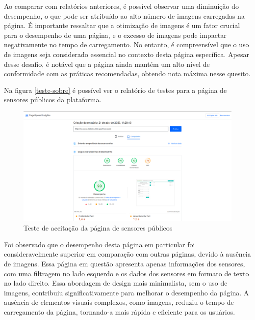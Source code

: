 \documentclass[tcc,capa]{texufpel}
\begin{document}
Ao comparar com relatórios anteriores, é possível observar uma diminuição do desempenho, o que pode ser atribuído ao alto número de imagens carregadas na página. É importante ressaltar que a otimização de imagens é um fator crucial para o desempenho de uma página, e o excesso de imagens pode impactar negativamente no tempo de carregamento. No entanto, é compreensível que o uso de imagens seja considerado essencial no contexto desta página específica. Apesar desse desafio, é notável que a página ainda mantém um alto nível de conformidade com as práticas recomendadas, obtendo nota máxima nesse quesito. 

Na figura \ref{teste-sobre} é possível ver o relatório de testes para a página de sensores públicos da plataforma.

\begin{figure}[htbp]
  \centering \includegraphics[scale=.25]{assets/desempenho-sensores.png}
  \caption{Teste de aceitação da página de sensores públicos}
  \label{teste-sensores}
\end{figure}
\newpage
Foi observado que o desempenho desta página em particular foi consideravelmente superior em comparação com outras páginas, devido à ausência de imagens. Essa página em questão apresenta apenas informações dos sensores, com uma filtragem no lado esquerdo e os dados dos sensores em formato de texto no lado direito. Essa abordagem de design mais minimalista, sem o uso de imagens, contribuiu significativamente para melhorar o desempenho da página. A ausência de elementos visuais complexos, como imagens, reduziu o tempo de carregamento da página, tornando-a mais rápida e eficiente para os usuários.
\end{document}

